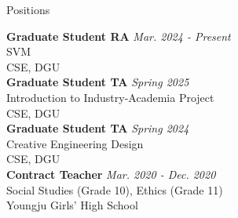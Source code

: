 \begin{rSection}{Positions}






{\bf Graduate Student \acf{RA}} \hfill {\em Mar. 2024 - Present} \\
\acf{SVM}\\
\acf{CSE}, \acf{DGU}\\

{\bf Graduate Student \acf{TA}} \hfill {\em Spring 2025} \\
Introduction to Industry-Academia Project\\
\acf{CSE}, \acf{DGU}\\


{\bf Graduate Student \acf{TA}} \hfill {\em Spring 2024} \\
Creative Engineering Design\\
\acf{CSE}, \acf{DGU}\\

{\bf Contract Teacher} \hfill {\em Mar. 2020 - Dec. 2020} \\
Social Studies (Grade 10), Ethics (Grade 11) \\
Youngju Girls' High School \\

\end{rSection}
    